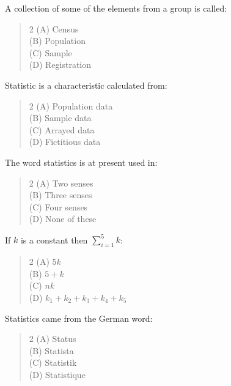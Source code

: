 \documentclass[11pt,a4paper]{article}
\begin{document}
\begin{mcqlist}
\item A collection of some of the elements from a group is called:
\begin{quote}\begin{multicols}{2}
\noindent (A) Census \\
(B) Population \\
(C) Sample \\
(D) Registration
\end{multicols}\end{quote}

\item Statistic is a characteristic calculated from:
\begin{quote}\begin{multicols}{2}
\noindent (A) Population data \\
(B) Sample data \\
(C) Arrayed data \\
(D) Fictitious data
\end{multicols}\end{quote}

\item The word statistics is at present used in:
\begin{quote}\begin{multicols}{2}
\noindent (A) Two senses \\
(B) Three senses \\
(C) Four senses \\
(D) None of these
\end{multicols}\end{quote}

\item If $k$ is a constant then $\displaystyle\sum_{i=1}^{5} k$:
\begin{quote}\begin{multicols}{2}
\noindent (A) $5k$ \\
(B) $5+k$ \\
(C) $nk$ \\
(D) $k_1+k_2+k_3+k_4+k_5$
\end{multicols}\end{quote}

\item Statistics came from the German word:
\begin{quote}\begin{multicols}{2}
\noindent (A) Status \\
(B) Statista \\
(C) Statistik \\
(D) Statistique
\end{multicols}\end{quote}


\end{mcqlist}
\end{document}
